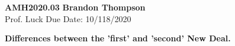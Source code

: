 \noindent
\textbf{AMH2020.03} \hfill \textbf{Brandon Thompson} \\
\normalsize Prof. Luck \hfill Due Date: 10/118/2020 \\

\begin{center}
\textbf{Differences between the 'first' and 'second' New Deal.}
\end{center}